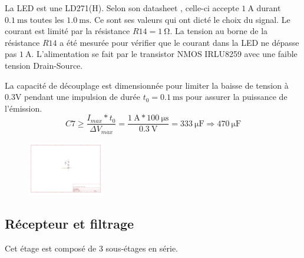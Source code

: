 \documentclass[french]{layout/Report}
\begin{document}
La LED est une LD271(H). Selon son datasheet \cite{LD271(H)}, celle-ci accepte $\SI{1}{\ampere}$ durant $\SI{0.1}{\milli\second}$ toutes les $\SI{1.0}{\milli\second}$. Ce sont ses valeurs qui ont dicté le choix du signal. Le courant est limité par la résistance $\mathit{R14} = \SI{1}{\ohm}$. 
La tension au borne de la résistance $\mathit{R14}$ a été mesurée pour vérifier que le courant dans la LED ne dépasse pas $\SI{1}{\ampere}$.
L'alimentation se fait par le transistor NMOS IRLU8259\cite{IRLU8259} avec une faible tension Drain-Source.

La capacité de découplage est dimensionnée pour limiter la baisse de tension à 0.3V pendant une impulsion de durée $t_0 = \SI{0.1}{\milli\second}$ pour assurer la puissance de l'émission.
\begin{equation*}
	\mathit{C7} \ge \frac{I_{max}*t_0}{\Delta V_{max}} = \frac{\SI{1}{\ampere}*\SI{100}{\micro\second}}{\SI{0.3}{\volt}} = \SI{333}{\micro\farad} \Rightarrow \SI{470}{\micro\farad}
\end{equation*}

\begin{figure}[H]
\centering
\includegraphics[width=0.3\textwidth]{fig/ir_led.pdf}
\end{figure}

\subsection{Récepteur et filtrage}
Cet étage est composé de 3 sous-étages en série.
\end{document}
